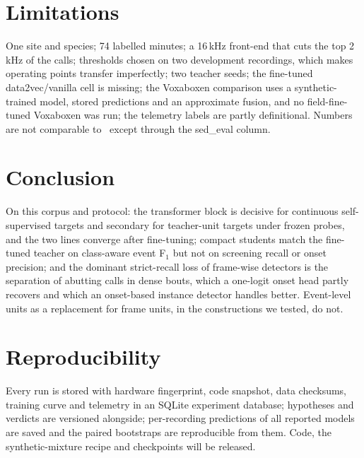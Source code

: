 \documentclass[10pt,twocolumn]{article}
\newcommand{\Fone}{F$_1$}
\begin{document}
\section{Limitations}
One site and species; 74 labelled minutes; a 16\,kHz front-end that cuts the top 2\,kHz of the calls; thresholds chosen on two development recordings, which makes operating points transfer imperfectly; two teacher seeds; the fine-tuned data2vec/vanilla cell is missing; the Voxaboxen comparison uses a synthetic-trained model, stored predictions and an approximate fusion, and no field-fine-tuned Voxaboxen was run; the telemetry labels are partly definitional. Numbers are not comparable to~\citep{sheipak2026mmb} except through the sed\_eval column.

\section{Conclusion}
On this corpus and protocol: the transformer block is decisive for continuous self-supervised targets and secondary for teacher-unit targets under frozen probes, and the two lines converge after fine-tuning; compact students match the fine-tuned teacher on class-aware event \Fone{} but not on screening recall or onset precision; and the dominant strict-recall loss of frame-wise detectors is the separation of abutting calls in dense bouts, which a one-logit onset head partly recovers and which an onset-based instance detector handles better. Event-level units as a replacement for frame units, in the constructions we tested, do not.

\section*{Reproducibility}
Every run is stored with hardware fingerprint, code snapshot, data checksums, training curve and telemetry in an SQLite experiment database; hypotheses and verdicts are versioned alongside; per-recording predictions of all reported models are saved and the paired bootstraps are reproducible from them. Code, the synthetic-mixture recipe and checkpoints will be released.
\end{document}
